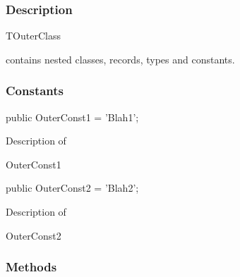 \documentclass{report}
\newif\ifpdf
\begin{document}
\subsubsection*{\large{\textbf{Description}}\normalsize\hspace{1ex}\hfill}
\begin{ttfamily}TOuterClass\end{ttfamily} contains nested classes, records, types and constants.\subsubsection*{\large{\textbf{Constants}}\normalsize\hspace{1ex}\hfill}
\begin{list}{}{
\setlength{\itemindent}{0cm}
\setlength{\listparindent}{0cm}
\setlength{\leftmargin}{\evensidemargin}
\addtolength{\leftmargin}{\tmplength}
\settowidth{\labelsep}{X}
\addtolength{\leftmargin}{\labelsep}
\setlength{\labelwidth}{\tmplength}
}
\label{ok_nested_types.TOuterClass-OuterConst1}
\item[\textbf{OuterConst1}\hfill]
\ifpdf
\begin{flushleft}
\fi
\begin{ttfamily}
public OuterConst1 = 'Blah1';\end{ttfamily}

\ifpdf
\end{flushleft}
\fi


\par Description of \begin{ttfamily}OuterConst1\end{ttfamily}\label{ok_nested_types.TOuterClass-OuterConst2}
\item[\textbf{OuterConst2}\hfill]
\ifpdf
\begin{flushleft}
\fi
\begin{ttfamily}
public OuterConst2 = 'Blah2';\end{ttfamily}

\ifpdf
\end{flushleft}
\fi


\par Description of \begin{ttfamily}OuterConst2\end{ttfamily}\end{list}
\subsubsection*{\large{\textbf{Methods}}\normalsize\hspace{1ex}\hfill}
\end{document}
